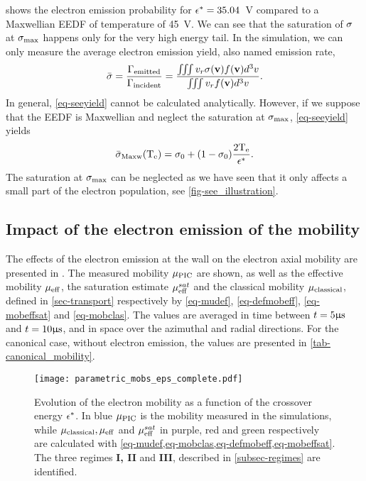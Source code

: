    shows the electron emission probability for $\epsilon^{*}=35.04$~V compared to a Maxwellian \ac{EEDF} of temperature of 45~V.
  We can see that the saturation of $\sigma $ at $\sigma _{\rm max} $ happens only for the very high energy tail.
  In the simulation, we can only measure the average electron emission yield, also named emission rate, 
  \begin{equation} \label{eq-seeyield}
     \bar{\sigma } = \frac{\Gamma_{\rm emitted}}{\Gamma_{\rm incident}} = \frac{\iiint v_r \sigma ({\mathbf v}) f({\mathbf v}) d^3v}{\iiint v_r  f({\mathbf v}) d^3v}.
  \end{equation}
  In general, \cref{eq-seeyield} cannot be calculated analytically.
  However, if we suppose that the \ac{EEDF} is Maxwellian and neglect the saturation at $\sigma _{\rm max} $, \cref{eq-seeyield} yields
  \begin{equation} \label{eq-seemaxw}
     \bar{\sigma }_{\rm Maxw}(\mathrm{T_e}) = \sigma _0 + (1 - \sigma _0) \frac{2 \mathrm{T_e}}{\epsilon^{*}}.
  \end{equation}
  The saturation at $\sigma _{\rm max} $ can be neglected as we have seen that it only affects a small part of the electron population, see \cref{fig-see_illustration}.
  
  \subsection{Impact of the electron emission of the mobility} \label{subsec-param-mob}
    
  The effects of the electron emission at the wall on the electron axial mobility are presented in .
  The measured mobility $\mu_{\mathrm{PIC}}$ are shown, as well as the effective mobility $\mu_{\mathrm{eff}}$, the saturation estimate $\mu_{\mathrm{eff}}^{sat}$ and the classical mobility $\mu_{\mathrm{classical}}$, defined in \cref{sec-transport} respectively by \cref{eq-mudef}, \cref{eq-defmobeff}, \cref{eq-mobeffsat} and \cref{eq-mobclas}.
  The values are averaged in time between $t=5 \mathrm{\upmu s}$ and $t=10\mathrm{\upmu s}$, and in space over the azimuthal and radial directions.
  For the canonical case, without electron emission, the values are presented in \cref{tab-canonical_mobility}.
  \begin{figure}[hbt]
    \centering
    \texttt{[image: parametric\_mobs\_eps\_complete.pdf]}
    \caption{Evolution of the electron mobility as a function of the crossover energy $\epsilon^{*}$. In blue $\mu_{\mathrm{PIC}}$ is the mobility measured in the simulations, while $\mu_{\mathrm{classical}}, \mu_{\mathrm{eff}}$ and $\mu_{\mathrm{eff}}^{sat}$ in purple, red and green respectively are calculated with \cref{eq-mudef,eq-mobclas,eq-defmobeff,eq-mobeffsat}. The three regimes {\bf I, II} and {\bf III}, described in \cref{subsec-regimes} are identified.}
    \label{fig-mob-epsstar}
  \end{figure}
  
